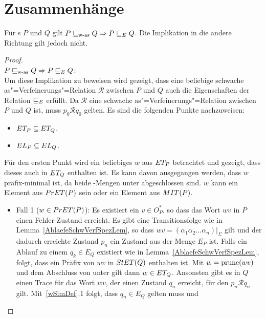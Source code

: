 \section{Zusammenhänge}
\label{errorZusammenh}

\begin{Satz}
  \label{ZusammenhFehlerSatz}
  Für \MEIO{}s $P$ und $Q$ gilt $P\sqsubseteq _{\mathrm{w}\text{-}\mathrm{as}} Q\Rightarrow P \sqsubseteq  _E Q$. Die
  Implikation in die andere Richtung gilt jedoch nicht.
\end{Satz}
\begin{proof}\mbox{}\\
  $P\sqsubseteq _{\mathrm{w}\text{-}\mathrm{as}} Q\Rightarrow P \sqsubseteq  _E Q$:\\
  Um diese Implikation zu beweisen wird gezeigt, dass eine beliebige
  schwache as"=Verfeinerungs"=Relation $\mathcal{R}$ zwischen $P$ und $Q$ auch
  die Eigenschaften der Relation $ \sqsubseteq  _E$ erfüllt. Da $\mathcal{R}$ eine
  schwache as"=Verfeinerungs"=Relation zwischen $P$ und $Q$ ist, muss $p_0
  \mathcal{R} q_0$ gelten. Es sind die folgenden Punkte nachzuweisen:
  \begin{itemize}
    \item $ET _P \subseteq ET _Q$,
    \item $EL _P \subseteq EL _Q$.
  \end{itemize}
  Für den ersten Punkt wird ein beliebiges $w$ aus $ET _P$ betrachtet und
  gezeigt, dass dieses auch in $ET _Q$ enthalten ist. Es kann davon
  ausgegangen werden, dass $w$ präfix-minimal ist, da beide \ET{}-Mengen unter
  \cont{} abgeschlossen sind. $w$ kann ein Element aus $PrET (P)$ sein oder
  ein Element aus $MIT (P)$.
  \begin{itemize}
    \item Fall 1 ($w\in PrET (P)$): Es existiert ein $v\in O_P^*$, so dass das
      Wort $wv$ in $P$ einen Fehler-Zustand erreicht. Es gibt eine
      Transitionsfolge wie in Lemma~\ref{AblaefeSchwVerfSpezLem}, so dass $wv =
      (\alpha _1\alpha _2\dots \alpha _n)|_{\Sigma}$ gilt und der dadurch
      erreichte Zustand $p_n$ ein Zustand aus der Menge $E_P$ ist. Falls ein
      Ablauf zu einem $q_k\in E_Q$ existiert wie in
      Lemma~\ref{AblaefeSchwVerfSpezLem}, folgt, dass ein Präfix von $wv$ in $StET
      (Q)$ enthalten ist. Mit $w=\mathrm{prune} (wv)$ und dem Abschluss von \ET{} unter
      \cont{} gilt dann $w\in ET _Q$. Ansonsten gibt es in $Q$ einen Trace für
      das Wort $wv$, der einen Zustand $q_n$ erreicht, für den $p_n \mathcal{R}
      q_n$ gilt. Mit~\ref{wSimDef}.1 folgt, dass $q_n\in E_Q$ gelten muss und

\end{itemize}
\end{proof}

